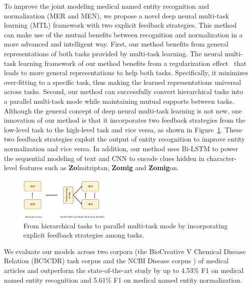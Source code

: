To improve the joint modeling medical named entity recognition and normalization (MER and MEN), we propose a novel deep neural multi-task learning (MTL) framework with two explicit feedback strategies. This method can make use of the mutual benefits between recognition and normalization in a more advanced and intelligent way. First, our method benefits from general representations of both tasks provided by multi-task learning. The neural multi-task learning framework of our method benefits from a regularization effect~\cite{Collobert2011,DBLP:journals/corr/Ruder17a} that leads to more general representations to help both tasks. Specifically, it minimizes over-fitting to a specific task, thus making the learned representations universal across tasks. Second, our method can successfully convert hierarchical tasks into a parallel multi-task mode while maintaining mutual supports between tasks. Although the general concept of deep neural multi-task learning is not new, one innovation of our method is that it incorporates two feedback strategies from the low-level task to the high-level task and vice versa, as shown in Figure~\ref{fig: trans}. 
These two feedback strategies exploit the output of entity recognition to improve entity normalization and vice versa.
In addition, our method uses Bi-LSTM to power the sequential modeling of text and CNN to encode clues hidden in character-level features such as \textbf{Zo}lmitriptan, \textbf{Zomig} and \textbf{Zomig}on.
\begin{figure}[tp]
	\centering
	\includegraphics[width=0.4\textwidth]{fig/tranformation}
	\vspace{-0.1in}
	\caption{From hierarchical tasks to parallel multi-task mode by incorporating explicit feedback strategies among tasks. %
		}\label{fig: trans}
	\vspace{-0.15in}
\end{figure}

We evaluate our models across two corpora (the BioCreative V Chemical Disease Relation (BC5CDR) task corpus \cite{Li2016BioCreative} and the NCBI Disease corpus \cite{Rezarta2014NCBI}) of medical articles and outperform the state-of-the-art study by up to 4.53\% F1 on medical named entity recognition and 5.61\% F1 on medical named entity normalization.




